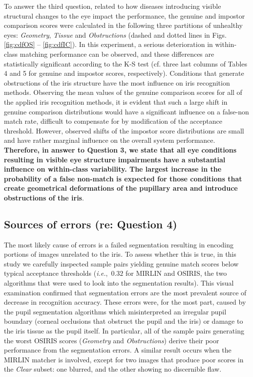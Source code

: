 \documentclass[article,12pt]{elsarticle}
\newcommand{\ie}{{\it i.e.},~}
\begin{document}
To answer the third question, related to how diseases introducing visible structural changes to the eye impact the performance, the genuine and impostor comparison scores were calculated in the following three partitions of unhealthy eyes: \emph{Geometry}, \emph{Tissue} and \emph{Obstructions} (dashed and dotted lines in Figs. \ref{fig:cdfOS} -- \ref{fig:cdfIC}). In this experiment, a serious deterioration in within-class matching performance can be observed, and these differences are statistically significant according to the K-S test (cf. three last columns of Tables 4 and 5 for genuine and impostor scores, respectively). Conditions that generate obstructions of the iris structure have the most influence on iris recognition methods.  Observing the mean values of the genuine comparison scores for all of the applied iris recognition methods, it is evident that such a large shift in genuine comparison distributions would have a significant influence on a false-non match rate, difficult to  compensate for  by modification of the acceptance threshold. However, observed shifts of the impostor score distributions are small and have rather marginal influence on the overall system performance. \textbf{Therefore, in answer to Question 3, we state that all eye conditions resulting in visible eye structure impairments have a substantial influence on within-class variability. The largest increase in the probability of a false non-match is expected for those conditions that create geometrical deformations of the pupillary area and introduce obstructions of the iris}.


\subsection{Sources of errors (re: Question 4)} 

The most likely cause of errors is a failed segmentation resulting in encoding portions of images unrelated to the iris. To assess whether this is true, in this study we carefully inspected sample pairs yielding genuine match scores below typical acceptance thresholds (\ie $0.32$ for MIRLIN and OSIRIS, the two algorithms that were used to look into the segmentation results). This visual examination confirmed that segmentation errors are the most prevalent source of decrease in recognition accuracy. These errors were, for the most part, caused by the pupil segmentation algorithms which misinterpreted an irregular pupil boundary (corneal occlusions that obstruct the pupil and the iris) or damage to the iris tissue as the pupil itself. In particular, all of the sample pairs generating the worst OSIRIS scores (\emph{Geometry} and \emph{Obstructions}) derive their poor performance from the segmentation errors. A similar result occurs when the MIRLIN matcher is involved, except for two images that produce poor scores in the \emph{Clear} subset: one blurred, and the other showing no discernible flaw.
\end{document}
